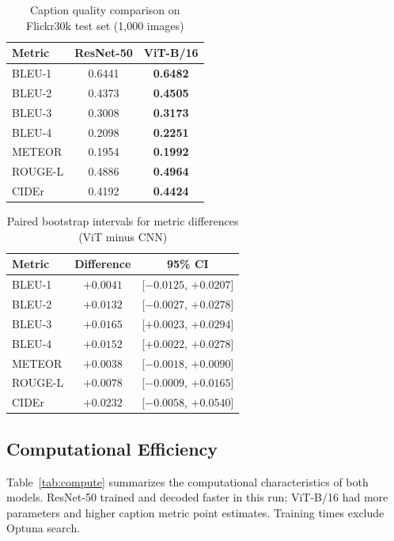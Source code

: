 \documentclass[conference]{IEEEtran}
\begin{document}
\begin{table}[htbp]
\caption{Caption quality comparison on Flickr30k test set (1{,}000 images)}
\label{tab:results}
\centering
\begin{tabular}{lcc}
\toprule
\textbf{Metric} & \textbf{ResNet-50} & \textbf{ViT-B/16} \\
\midrule
BLEU-1  & 0.6441 & \textbf{0.6482} \\
BLEU-2  & 0.4373 & \textbf{0.4505} \\
BLEU-3  & 0.3008 & \textbf{0.3173} \\
BLEU-4  & 0.2098 & \textbf{0.2251} \\
METEOR  & 0.1954 & \textbf{0.1992} \\
ROUGE-L & 0.4886 & \textbf{0.4964} \\
CIDEr   & 0.4192 & \textbf{0.4424} \\
\bottomrule
\end{tabular}
\end{table}

\begin{table}[htbp]
\caption{Paired bootstrap intervals for metric differences (ViT minus CNN)}
\label{tab:bootstrap}
\centering
\begin{tabular}{lcc}
\toprule
\textbf{Metric} & \textbf{Difference} & \textbf{95\% CI} \\
\midrule
BLEU-1 & $+0.0041$ & [$-0.0125$, $+0.0207$] \\
BLEU-2 & $+0.0132$ & [$-0.0027$, $+0.0278$] \\
BLEU-3 & $+0.0165$ & [$+0.0023$, $+0.0294$] \\
BLEU-4 & $+0.0152$ & [$+0.0022$, $+0.0278$] \\
METEOR & $+0.0038$ & [$-0.0018$, $+0.0090$] \\
ROUGE-L & $+0.0078$ & [$-0.0009$, $+0.0165$] \\
CIDEr & $+0.0232$ & [$-0.0058$, $+0.0540$] \\
\bottomrule
\end{tabular}
\end{table}

\subsection{Computational Efficiency}

Table~\ref{tab:compute} summarizes the computational characteristics of both models. ResNet-50 trained and decoded faster in this run; ViT-B/16 had more parameters and higher caption metric point estimates. Training times exclude Optuna search.
\end{document}
